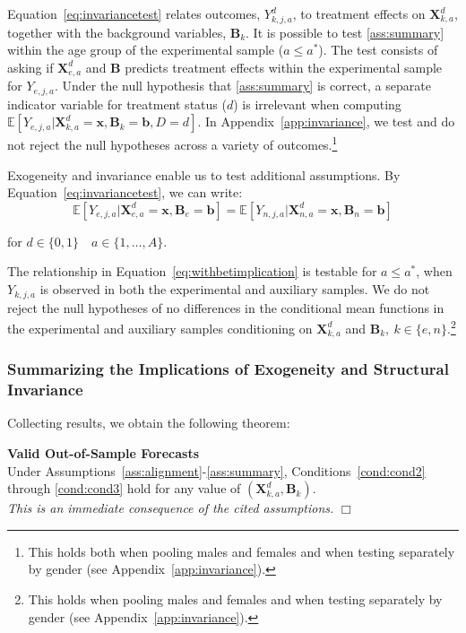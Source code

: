 Equation~\eqref{eq:invariancetest} relates outcomes, $Y_{k,j,a}^d$, to treatment effects on $\bm{X}_{k,a}^d$, together with the background variables, $\bm{B}_k$. It is possible to test \ref{ass:summary} within the age group of the experimental sample ($a \leq a^*$). The test consists of asking if $\bm{X}_{e,a}^d$ and $\bm{B}$ predicts treatment effects within the experimental sample for $Y_{e,j,a}$. Under the null hypothesis that \ref{ass:summary} is correct, a separate indicator variable for treatment status ($d$) is irrelevant when computing $\mathbb{E} \left[ Y_{e,j,a} | \bm{X}_{k,a}^d  = \bm{x}, \bm{B}_k =  \bm{b}, D = d \right]$. In  Appendix~\ref{app:invariance}, we test and do not reject the null hypotheses across a variety of outcomes.\footnote{This holds both when pooling males and females and when testing separately by gender (see  Appendix~\ref{app:invariance}).}

Exogeneity and invariance enable us to test additional assumptions. By Equation~\eqref{eq:invariancetest}, we can write:
\begin{equation}\label{eq:withbetimplication}
\mathbb{E} \left[ Y_{e,j,a} | \bm{X}^d_{e,a} = \bm{x}, \bm{B}_e = \bm{b} \right] = \mathbb{E} \left[ Y_{n,j,a} | \bm{X}^d_{n,a} = \bm{x}, \bm{B}_n = \bm{b} \right]
\end{equation}

\noindent for $d \in \{0,1\} \quad  a \in \{1,\dots,A\}$.

The relationship in Equation~\eqref{eq:withbetimplication} is testable for $a \leq a^*$, when $Y_{k,j,a}$ is observed in both the experimental and auxiliary samples. We do not reject the null hypotheses of no differences in the conditional mean functions in the experimental and auxiliary samples conditioning on $\bm{X}_{k,a}^d$ and $\bm{B}_k, \: k \in \{e,n\}$.\footnote{This holds when pooling males and females and when testing separately by gender (see  Appendix~\ref{app:invariance}).}

\subsubsection{Summarizing the Implications of Exogeneity and Structural Invariance}

Collecting results, we obtain the following theorem:

\onehalfspacing
\setcounter{theorem}{0}
\begin{theorem}\label{theorem:main} \textbf{Valid Out-of-Sample Forecasts} \\
Under Assumptions~\ref{ass:alignment}-\ref{ass:summary}, Conditions~\ref{cond:cond2} through \ref{cond:cond3} hold for any value of $\left( \bm{X}^d_{k,a}, \bm{B}_k \right)$. \\
\emph{This is an immediate consequence of the cited assumptions.} $\Box$
\end{theorem}
\doublespacing

